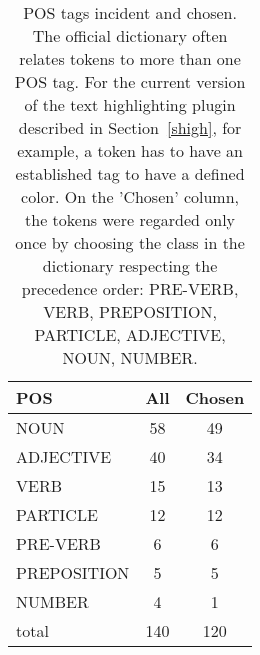 \begin{table*}[h!]
\begin{center}
\caption{POS tags incident and chosen.
            The official dictionary often relates tokens
            to more than one POS tag.
            For the current version of the text highlighting plugin described in
            Section~\ref{shigh}, for example,
            a token has to have an established tag to have
            a defined color.
            On the 'Chosen' column, the tokens were regarded only once
            by choosing the class in the dictionary respecting the
            precedence order: PRE-VERB, VERB, PREPOSITION, PARTICLE, ADJECTIVE, NOUN, NUMBER.}\label{foobar}
\begin{tabular}{ l | c c }
POS & All  & Chosen \\\hline
NOUN & 58  & 49 \\
ADJECTIVE & 40  & 34 \\
VERB & 15  & 13 \\
PARTICLE & 12  & 12 \\
PRE-VERB & 6  & 6 \\
PREPOSITION & 5  & 5 \\
NUMBER & 4  & 1 \\\hline
total & 140  & 120 \\
\end{tabular}\end{center}
\end{table*}
